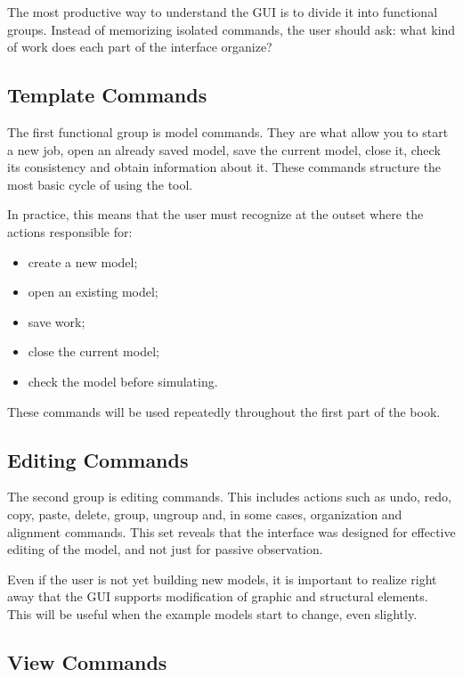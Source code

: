 The most productive way to understand the GUI is to divide it into functional groups. Instead of memorizing isolated commands, the user should ask: what kind of work does each part of the interface organize?

\subsection{Template Commands}
\label{subsec:cap3_comandos_modelo}

The first functional group is model commands. They are what allow you to start a new job, open an already saved model, save the current model, close it, check its consistency and obtain information about it. These commands structure the most basic cycle of using the tool.

In practice, this means that the user must recognize at the outset where the actions responsible for:
\begin{itemize}
\item create a new model;
\item open an existing model;
\item save work;
\item close the current model;
\item check the model before simulating.
\end{itemize}

These commands will be used repeatedly throughout the first part of the book.

\subsection{Editing Commands}
\label{subsec:cap3_comandos_edicao}

The second group is editing commands. This includes actions such as undo, redo, copy, paste, delete, group, ungroup and, in some cases, organization and alignment commands. This set reveals that the interface was designed for effective editing of the model, and not just for passive observation.

Even if the user is not yet building new models, it is important to realize right away that the GUI supports modification of graphic and structural elements. This will be useful when the example models start to change, even slightly.

\subsection{View Commands}
\label{subsec:cap3_comandos_visualizacao}

